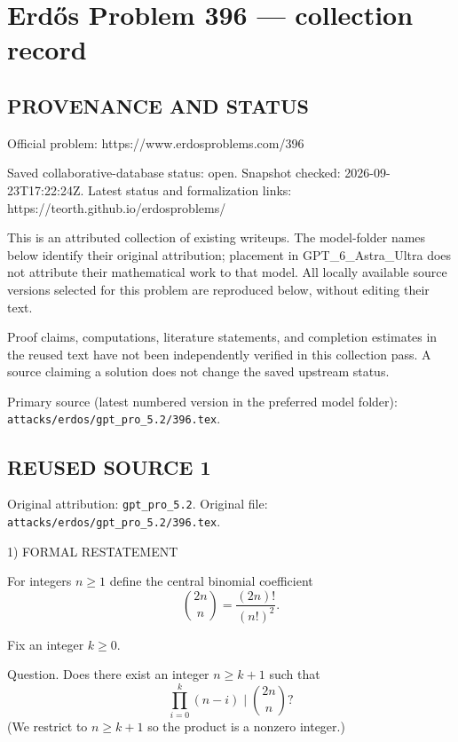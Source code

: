 \section*{Erd\H{o}s Problem 396 --- collection record}

\subsection*{PROVENANCE AND STATUS}
Official problem: https://www.erdosproblems.com/396

Saved collaborative-database status: open.
Snapshot checked: 2026-09-23T17:22:24Z.
Latest status and formalization links: https://teorth.github.io/erdosproblems/

This is an attributed collection of existing writeups. The model-folder names below identify their original attribution; placement in GPT\_6\_Astra\_Ultra does not attribute their mathematical work to that model. All locally available source versions selected for this problem are reproduced below, without editing their text.

Proof claims, computations, literature statements, and completion estimates in the reused text have not been independently verified in this collection pass. A source claiming a solution does not change the saved upstream status.

Primary source (latest numbered version in the preferred model folder): \texttt{attacks/erdos/gpt\_pro\_5.2/396.tex}.

\subsection*{REUSED SOURCE 1}
Original attribution: \texttt{gpt\_pro\_5.2}.
Original file: \texttt{attacks/erdos/gpt\_pro\_5.2/396.tex}.


1) FORMAL RESTATEMENT

For integers $n\ge 1$ define the central binomial coefficient
\[
\binom{2n}{n}=\frac{(2n)!}{(n!)^2}.
\]

Fix an integer $k\ge 0$.

Question.
Does there exist an integer $n\ge k+1$ such that
\[
\prod_{i=0}^{k} (n-i) \mid \binom{2n}{n}?
\]
(We restrict to $n\ge k+1$ so the product is a nonzero integer.)

